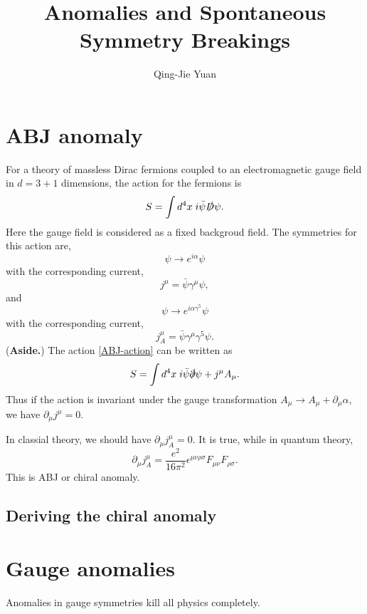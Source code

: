 \documentclass[a4paper,11pt]{article}
\title{Anomalies and Spontaneous Symmetry Breakings}
\author{Qing-Jie Yuan}
\date{ }
\begin{document}
\maketitle
\tableofcontents

\section{ABJ anomaly}
For a theory of massless Dirac fermions coupled to an electromagnetic gauge field in $d=3+1$ dimensions,
the action for the fermions is
\begin{equation}
    S=\int d^4 x\; i\bar{\psi}\slashed{D}\psi.
\end{equation} 
Here the gauge field is considered as a fixed backgroud field.
The symmetries for this action are,
\begin{equation}\label{ABJ-action}
    \psi\to e^{i \alpha}\psi
\end{equation}
with the corresponding current,
\begin{equation}
    j^\mu=\bar{\psi}\gamma^{\mu}\psi,
\end{equation}
and
\begin{equation}
    \psi\to e^{i \alpha \gamma^5}\psi
\end{equation}
with the corresponding current,
\begin{equation}
    j^{\mu}_A=\bar\psi \gamma^\mu \gamma^5 \psi.
\end{equation}
(\textbf{Aside.})
The action \eqref{ABJ-action} can be written as
\begin{equation}
    S=\int d^4 x\; i\bar{\psi}\slashed{\partial}\psi+j^{\mu}A_{\mu}.
\end{equation}
Thus if the action is invariant under the gauge transformation $A_\mu\to A_\mu+\partial_\mu \alpha$,
we have $\partial_\mu j^\mu=0$.\par
In classial theory, we should have $\partial_\mu j_A^{\mu}=0$. It is true, while in quantum theory,
\begin{equation}\label{chiral-anomaly}
    \partial_\mu j_A^{\mu}= \frac{e^2}{16\pi^2}\epsilon^{\mu \nu \rho \sigma}F_{\mu \nu}F_{\rho \sigma}.
\end{equation} 
This is ABJ or chiral anomaly.
\subsection{Deriving the chiral anomaly}

\section{Gauge anomalies}
Anomalies in gauge symmetries kill all physics completely.
\end{document}
